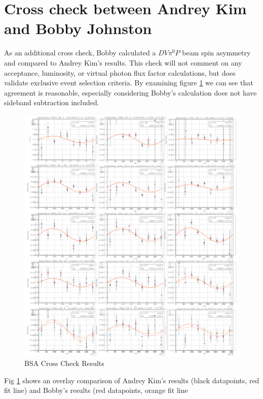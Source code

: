 \section{Cross check between Andrey Kim and Bobby Johnston}

As an additional cross check, Bobby calculated a $DV\pi^0P$ beam spin asymmetry and compared to Andrey Kim's results. This check will not comment on any acceptance, luminosity, or virtual photon flux factor calculations, but does validate exclusive event selection criteria. By examining figure \ref{fig:bsa} we can see that agreement is reasonable, especially considering Bobby's calculation does not have sideband subtraction included.

\begin{figure}[hbt]
	\centering
	\includegraphics[width=0.75\linewidth]{Postamble/appb_pics/BSA.png}
	
	
	\caption{BSA Cross Check Results}
	\label{fig:bsa}
\end{figure}

Fig \ref{fig:bsa} shows an overlay comparison of Andrey Kim's results (black datapoints, red fit line) and Bobby's results (red datapoints, orange fit line
